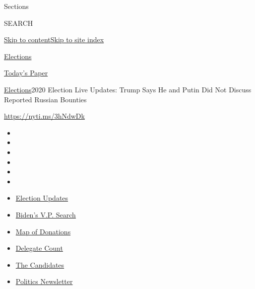 Sections

SEARCH

\protect\hyperlink{site-content}{Skip to
content}\protect\hyperlink{site-index}{Skip to site index}

\href{https://www.nytimes3xbfgragh.onion/news-event/2020-election}{Elections}

\href{https://myaccount.nytimes3xbfgragh.onion/auth/login?response_type=cookie\&client_id=vi}{}

\href{https://www.nytimes3xbfgragh.onion/section/todayspaper}{Today's
Paper}

\href{/news-event/2020-election}{Elections}\textbar{}2020 Election Live
Updates: Trump Says He and Putin Did Not Discuss Reported Russian
Bounties

\url{https://nyti.ms/3hNdwDk}

\begin{itemize}
\item
\item
\item
\item
\item
\item
\end{itemize}

\begin{itemize}
\item
  \href{https://www.nytimes3xbfgragh.onion/2020/07/29/us/elections/biden-vs-trump.html?action=click\&pgtype=Article\&state=default\&region=TOP_BANNER\&context=storylines_menu}{Election
  Updates}
\item
  \href{https://www.nytimes3xbfgragh.onion/article/biden-vice-president-2020.html?action=click\&pgtype=Article\&state=default\&region=TOP_BANNER\&context=storylines_menu}{Biden's
  V.P. Search}
\item
  \href{https://www.nytimes3xbfgragh.onion/interactive/2020/07/24/us/politics/trump-biden-campaign-donors.html?action=click\&pgtype=Article\&state=default\&region=TOP_BANNER\&context=storylines_menu}{Map
  of Donations}
\item
  \href{https://www.nytimes3xbfgragh.onion/interactive/2020/us/elections/delegate-count-primary-results.html?action=click\&pgtype=Article\&state=default\&region=TOP_BANNER\&context=storylines_menu}{Delegate
  Count}
\item
  \href{https://www.nytimes3xbfgragh.onion/interactive/2019/us/politics/2020-presidential-candidates.html?action=click\&pgtype=Article\&state=default\&region=TOP_BANNER\&context=storylines_menu}{The
  Candidates}
\item
  \href{https://www.nytimes3xbfgragh.onion/newsletters/politics?action=click\&pgtype=Article\&state=default\&region=TOP_BANNER\&context=storylines_menu}{Politics
  Newsletter}
\end{itemize}

